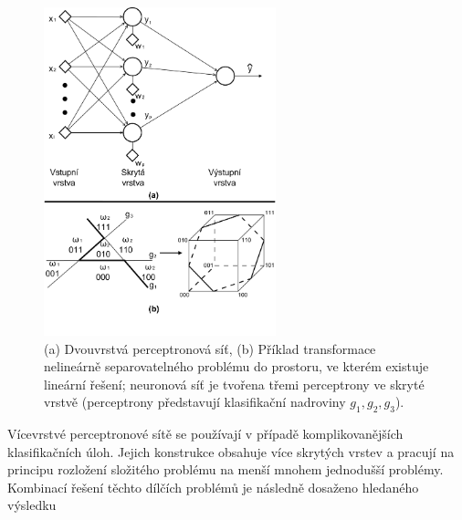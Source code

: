 {{\begin{figure}[!ht]
	\centering
	\includegraphics[width = 0.6\textwidth, trim = 0cm 2cm 0cm 0cm]{./Img/Prednaska09/nn/NN01.pdf}
	\caption{(a) Dvouvrstvá perceptronová síť, (b) Příklad transformace nelineárně separovatelného problému do prostoru, ve kterém existuje lineární řešení; neuronová síť je tvořena třemi perceptrony ve skryté vrstvě (perceptrony představují klasifikační nadroviny $g_1,g_2,g_3$).}
	\label{fig:NN01}
\end{figure}}

\par{Vícevrstvé perceptronové sítě se používají v případě komplikovanějších klasifikačních úloh. Jejich konstrukce obsahuje více skrytých vrstev a pracují na principu rozložení složitého problému na menší mnohem jednodušší problémy. Kombinací řešení těchto dílčích problémů je následně dosaženo hledaného výsledku}





\newpage





}
